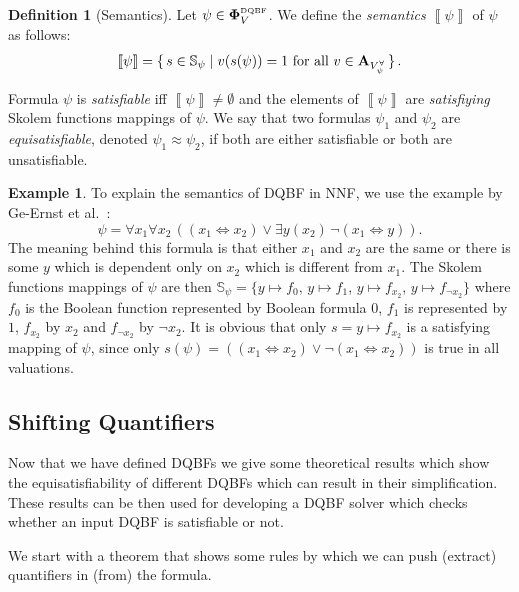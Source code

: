 \documentclass[
  digital, %
  color,
  twoside, %
  table,   %
  nolof,     %
  nolot,     %
]{fithesis3}
\let\setbuilder\set
\newcommand{\simpleset}[1]{\{{#1}\}}
\renewcommand{\set}[1]{\normalexpandarg\IfSubStr{#1}{|}{\setbuilder{#1}}{\simpleset{#1}}}
\theoremstyle{definition}
\newtheorem{definition}{Definition}
\newtheorem{example}{Example}
\theoremstyle{remark}
\newcommand{\seman}[1]{\left\llbracket {#1} \right\rrbracket}
\newcommand{\DQBF}[1]{\mathbf{\Phi}_{#1}^{\normalfont{\text{\tiny DQBF}}}}
\newcommand{\valtns}[1]{\mathbf{A}_{#1}}
\newcommand{\uvars}[1]{V_{#1}^{\forall}}
\newcommand{\Scands}[1]{\mathbb{S}_{#1}}
\newcommand{\lequal}{\Leftrightarrow}
\newcommand{\itholds}{\,}
\begin{document}
\begin{definition}[Semantics]
  Let $\psi \in \DQBF{V}$. We define the \emph{semantics} $\seman{\psi}$ of $\psi$ as follows:
  \[\seman{\psi} = \set{s \in \Scands{\psi} | v(s(\psi))=1 \text{ for all } v \in \valtns{\uvars{\psi}}}.\]
\end{definition}
Formula $\psi$ is \emph{satisfiable} iff $\seman{\psi} \not= \emptyset$ and the elements of $\seman{\psi}$ are \emph{satisfiying} Skolem functions mappings of $\psi$. We say that two formulas $\psi_1$ and $\psi_2$ are \emph{equisatisfiable}, denoted $\psi_1 \approx \psi_2$, if both are either satisfiable or both are unsatisfiable.
\begin{example}
\label{ex:DQBF:NNF}
To explain the semantics of DQBF in NNF, we use the example by Ge-Ernst et al.~\cite{HQSquantifierLocalisation}:
\[\psi = \forall x_1 \forall x_2\itholds ((x_1 \lequal x_2) \lor \exists y (x_2)\itholds \neg(x_1 \lequal y)).\]
The meaning behind this formula is that either $x_1$ and $x_2$ are the same or there is some $y$ which is dependent only on $x_2$ which is different from $x_1$. The Skolem functions mappings of $\psi$ are then $\Scands{\psi} = \{y\mapsto f_0$, $y\mapsto f_1$, $y\mapsto f_{x_2}$, $y\mapsto f_{\neg x_2}\}$ where $f_0$ is the Boolean function represented by Boolean formula $0$, $f_1$ is represented by $1$, $f_{x_2}$ by $x_2$ and $f_{\neg x_2}$ by $\neg x_2$. It is obvious that only $s = y \mapsto f_{x_2}$ is a satisfying mapping of $\psi$, since only $s(\psi) = ((x_1 \lequal x_2) \lor \neg(x_1 \lequal x_2))$ is true in all valuations.
\end{example}

\subsection{Shifting Quantifiers}
\label{sec:quantLocalisation}
Now that we have defined DQBFs we give some theoretical results which show the equisatisfiability of different DQBFs which can result in their simplification. These results can be then used for developing a DQBF solver which checks whether an input DQBF is satisfiable or not.

We start with a theorem that shows some rules by which we can push (extract) quantifiers in (from) the formula. 
\end{document}
